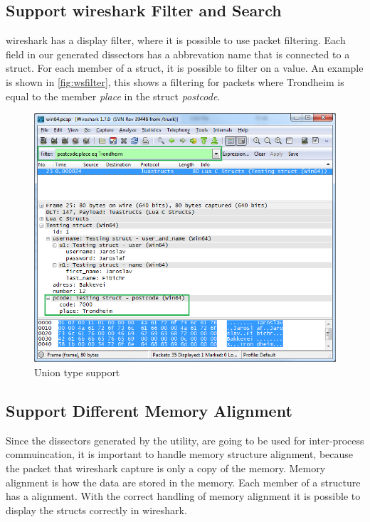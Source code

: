 \subsection{Support \Gls{wireshark} Filter and Search}
\Gls{wireshark} has a display filter, where it is possible to use \gls{packet} filtering. 
Each field in our generated \glspl{dissector} has a abbrevation name that is 
connected to a \gls{struct}. For each \gls{member} of a \gls{struct}, it is possible to filter 
on a value. An example is shown in \autoref{fig:wsfilter}, this shows a 
filtering for \glspl{packet} where Trondheim is equal to the \gls{member} \emph{place} in 
the \gls{struct} \emph{postcode}. 

\begin{figure}[ht]
	\center
	\includegraphics[width=\textwidth]{./sprints/img/wireshark_filter}
	\caption{Union type support\label{fig:wsfilter}}
\end{figure}

\subsection{Support Different Memory Alignment}
Since the \glspl{dissector} generated by the \gls{utility}, are going to be used for 
inter-process commuincation, it is important to handle memory structure 
alignment, because the \gls{packet} that \Gls{wireshark} capture is only a copy of the 
memory. Memory alignment is how the data are stored in the memory. Each \gls{member} 
of a structure has a alignment. With the correct handling of memory alignment it is 
possible to display the \glspl{struct} correctly in \Gls{wireshark}.

